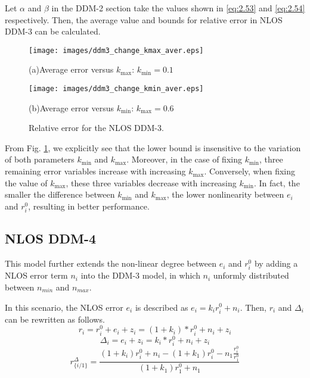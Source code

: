 \documentclass[journal]{IEEEtran}
\begin{document}
Let $\alpha$ and $\beta$ in the DDM-2 section take the values shown in \eqref{eq:2.53} and \eqref{eq:2.54} respectively. Then, the average value and bounds for relative error in NLOS DDM-3 can be calculated.

\begin{figure}[htb!]
    \centering
    \begin{minipage}{0.3\textwidth}
        \centering
        \texttt{[image: images/ddm3\_change\_kmax\_aver.eps]}
        \caption*{(a)\quad Average error versus ${k_{\max}} $: ${k_{\min} = 0.1}$}
    \end{minipage}
    \vspace{0.5cm} %
    \begin{minipage}{0.3\textwidth}
        \centering
        \texttt{[image: images/ddm3\_change\_kmin\_aver.eps]}
        \caption*{(b)\quad Average error versus ${k_{\min}} $: ${k_{\max} = 0.6}$}
    \end{minipage}
    \vspace{-0.5cm}
    \caption{Relative error for the NLOS DDM-3.}
    \label{fig:Fig4}
 \end{figure}
 
From Fig. \ref{fig:Fig4}, we explicitly see that the lower bound is insensitive to the variation of both parameters ${k_{\min}}$ and ${k_{\max}}$. Moreover, in the case of fixing ${k_{\min}}$, three remaining error variables increase with increasing ${k_{\max}}$. Conversely, when fixing the value of ${k_{\max}}$, these three variables decrease with increasing ${k_{\min}}$. In fact, the smaller the difference between ${k_{\min}}$ and ${k_{\max}}$, the lower nonlinearity between $e_i$ and ${{r}_{i}^{0}}$, resulting in better performance.
 \subsection{NLOS DDM-4}

This model further extends the non-linear degree between ${e_i}$ and ${{r}_{i}^{0}}$ by adding a NLOS error term ${n_i}$ into the DDM-3 model, in which ${n_i}$ unformly distributed between ${n_{min}}$ and ${n_{max}}$.

In this scenario, the NLOS error ${e_i}$ is described as ${e_i} = {k_i}{{r}_{i}^{0}}+{n_i}$. Then, $r_i$ and ${\Delta}_i$ can be rewritten as follows.
 \begin{equation}\label{eq:2.55}
 {r_i} = r_i^0 + {e_i} + {z_i} = \left(1+{k_i}\right)*{{r}_{i}^{0}}+{n_i}+{z_i}
  \end{equation}
  \begin{equation}\label{eq:2.56}
 {{\Delta}_i} = {e_i} + {z_i} = {k_i}*{{r}_{i}^{0}}+{n_i}+{z_i}
  \end{equation}
 \begin{equation}\label{eq:2.57}
 {{r}_{\{i/1\}}^{\Delta}}
 = \frac{\left(1+{k_i}\right){{r}_{i}^{0}}+{n_i}-\left(1+{k_1}\right){{r}_{i}^{0}}-{n_1}{\frac{{r_{i}^{0}}}{{r}_{1}^{0}}}}{\left(1+{k_1}\right){{r}_{1}^{0}}+{n_1}}
 \end{equation}
 
\end{document}
